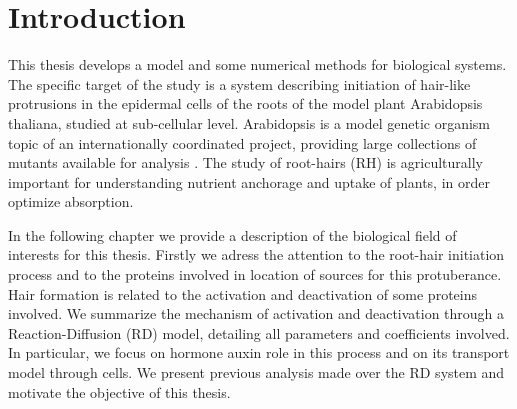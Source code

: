 \chapter{Introduction}\label{cap:intro}
This thesis develops a model and some numerical methods for biological systems. The specific target of the study is a system describing initiation of hair-like protrusions in the epidermal cells of the roots of the model plant Arabidopsis thaliana, studied at sub-cellular level.
Arabidopsis is a model genetic organism topic of an internationally coordinated project, providing large collections of mutants available for analysis \cite{intra1_R:Arabook}. The study of root-hairs (RH) is agriculturally important for understanding nutrient anchorage and uptake of plants, in order optimize absorption.

In the following chapter we provide a description of the biological field of interests for this thesis. Firstly we adress the attention to the root-hair initiation process and to the proteins involved in location of sources for this protuberance. Hair formation is related to the activation and deactivation of some proteins involved. We summarize the mechanism of activation and deactivation through a Reaction-Diffusion (RD) model, detailing all parameters and coefficients involved. In particular, we focus on hormone auxin role in this process and on its transport model through cells. We present previous analysis made over the RD system and motivate the objective of this thesis.

